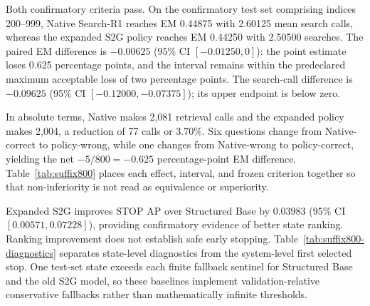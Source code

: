 \documentclass[11pt,a4paper]{article}
\begin{document}
Both confirmatory criteria pass. On the confirmatory test set comprising indices 200--999, Native Search-R1 reaches EM 0.44875 with 2.60125 mean search calls, whereas the expanded S2G policy reaches EM 0.44250 with 2.50500 searches. The paired EM difference is $-0.00625$ (95\% CI $[-0.01250,0]$): the point estimate loses 0.625 percentage points, and the interval remains within the predeclared maximum acceptable loss of two percentage points. The search-call difference is $-0.09625$ (95\% CI $[-0.12000,-0.07375]$); its upper endpoint is below zero.

In absolute terms, Native makes 2,081 retrieval calls and the expanded policy makes 2,004, a reduction of 77 calls or 3.70\%. Six questions change from Native-correct to policy-wrong, while one changes from Native-wrong to policy-correct, yielding the net $-5/800=-0.625$ percentage-point EM difference. Table~\ref{tab:suffix800} places each effect, interval, and frozen criterion together so that non-inferiority is not read as equivalence or superiority.

\begin{table}[H]
\centering
\small
\caption{Primary results on the confirmatory test set. Differences are Expanded S2G minus Native; both frozen criteria pass.}
\label{tab:suffix800}
\end{table}

Expanded S2G improves STOP AP over Structured Base by 0.03983 (95\% CI $[0.00571,0.07228]$), providing confirmatory evidence of better state ranking. Ranking improvement does not establish safe early stopping. Table~\ref{tab:suffix800-diagnostics} separates state-level diagnostics from the system-level first selected stop. One test-set state exceeds each finite fallback sentinel for Structured Base and the old S2G model, so these baselines implement validation-relative conservative fallbacks rather than mathematically infinite thresholds.
\end{document}
